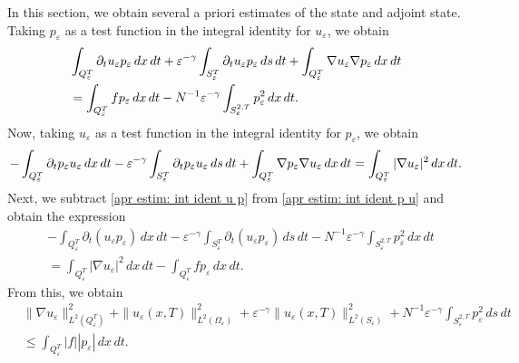\documentclass[reqno]{amsart}
\begin{document}
In this section, we obtain several a priori estimates of the state and adjoint
state. Taking $p_{\varepsilon }$ as a test function in the integral identity
for $u_{\varepsilon }$, we obtain
\begin{equation}
\begin{aligned}
&\int _{Q_{\varepsilon }^{T}}\partial _{t}u_{\varepsilon
}p_{\varepsilon }\,dx\,dt+\varepsilon ^{-\gamma }\int _{S_{\varepsilon
}^{T}}\partial _{t}u_{\varepsilon }p_{\varepsilon }\,ds\,dt+\int
_{Q_{\varepsilon }^{T}}\nabla u_{\varepsilon }\nabla p_{\varepsilon }{%
\,dx\,dt} \\
&=\int _{Q_{\varepsilon }^{T}}fp_{\varepsilon }\,dx\,dt%
-N^{-1}\varepsilon ^{-\gamma }\int _{S_{\varepsilon
}^{2,T}}p_{\varepsilon }^2\,dx\,dt.
\end{aligned} \label{apr estim: int ident u p}
\end{equation}
Now, taking $u_{\varepsilon }$ as a test function in the integral identity
for $p_{\varepsilon }$, we obtain
\begin{equation}
-\int _{Q_{\varepsilon }^{T}}\partial _{t}p_{\varepsilon
}u_{\varepsilon }\,dx\,dt-\varepsilon ^{-\gamma }\int _{S_{\varepsilon
}^{T}}\partial _{t}p_{\varepsilon }u_{\varepsilon }\,ds\,dt+\int
_{Q_{\varepsilon }^{T}}\nabla p_{\varepsilon }\nabla u_{\varepsilon }{%
\,dx\,dt}
=\int _{Q_{\varepsilon }^{T}}|\nabla u_{\varepsilon }|^2\,dx\,dt.
\label{apr estim: int ident p u}
\end{equation}%
Next, we subtract \eqref{apr estim: int ident u p} from
\eqref{apr estim: int ident p u} and obtain the expression
\begin{align*}
&-\int _{Q_{\varepsilon }^{T}}\partial _{t}(u_{\varepsilon
}p_{\varepsilon })\,dx\,dt-\varepsilon ^{-\gamma }\int _{S_{\varepsilon
}^{T}}\partial _{t}(u_{\varepsilon }p_{\varepsilon })\,ds\,dt%
-N^{-1}\varepsilon ^{-\gamma }\int _{S_{\varepsilon
}^{2,T}}p_{\varepsilon }^2\,dx\,dt \\
&=\int _{Q_{\varepsilon }^{T}}|\nabla u_{\varepsilon }|^2\,dx\,dt-\int
_{Q_{\varepsilon }^{T}}fp_{\varepsilon }\,dx\,dt.
\end{align*}
From this, we obtain
\begin{equation}
\begin{aligned}
&\| \nabla u_{\varepsilon }\| _{L^2(Q_{\varepsilon }^{T})}^2+\|
u_{\varepsilon }(x,T)\| _{L^2(\Omega _{\varepsilon })}^2+\varepsilon
^{-\gamma }\| u_{\varepsilon }(x,T)\| _{L^2(S_{\varepsilon })}^2
+N^{-1}\varepsilon ^{-\gamma }\int _{S_{\varepsilon
}^{2,T}}p_{\varepsilon }^2\,ds\,dt \\
&\leq \int _{Q_{\varepsilon
}^{T}}|f||p_{\varepsilon }|\,dx\,dt.
\end{aligned}  \label{apr estim: u estim 1}
\end{equation}
\end{document}
